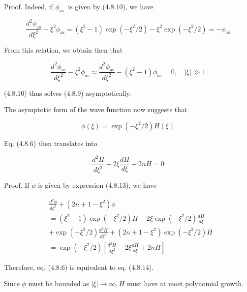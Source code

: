 \documentclass{article}
\begin{document}
Proof. Indeed, if $\phi_{\text {as }}$ is given by (4.8.10), we have
 
\begin{equation*}
\frac{d^{2} \phi_{\mathrm{as}}}{d \xi^{2}}-\xi^{2} \phi_{\mathrm{as}}=\left(\xi^{2}-1\right) \exp \left(-\xi^{2} / 2\right)-\xi^{2} \exp \left(-\xi^{2} / 2\right)=-\phi_{\mathrm{as}} \tag{4.8.11}
\end{equation*}
 

From this relation, we obtain then that
 
\begin{equation*}
\frac{d^{2} \phi_{\mathrm{as}}}{d \xi^{2}}-\xi^{2} \phi_{\mathrm{as}} \approx \frac{d^{2} \phi_{\mathrm{as}}}{d \xi^{2}}-\left(\xi^{2}-1\right) \phi_{\mathrm{as}}=0, \quad|\xi| \gg 1 \tag{4.8.12}
\end{equation*}
 
(4.8.10) thus solves (4.8.9) asymptotically.

The asymptotic form of the wave function now suggests that
 
\begin{equation*}
\phi(\xi)=\exp \left(-\xi^{2} / 2\right) H(\xi) \tag{4.8.13}
\end{equation*}
 

Eq. (4.8.6) then translates into
 
\begin{equation*}
\frac{d^{2} H}{d \xi^{2}}-2 \xi \frac{d H}{d \xi}+2 n H=0 \tag{4.8.14}
\end{equation*}
 

Proof. If $\phi$ is given by expression (4.8.13), we have
 
\begin{align*}
& \frac{d^{2} \phi}{d \xi^{2}}+\left(2 n+1-\xi^{2}\right) \phi  \tag{4.8.15}\\
& =\left(\xi^{2}-1\right) \exp \left(-\xi^{2} / 2\right) H-2 \xi \exp \left(-\xi^{2} / 2\right) \frac{d H}{d \xi} \\
& +\exp \left(-\xi^{2} / 2\right) \frac{d^{2} H}{d \xi^{2}}+\left(2 n+1-\xi^{2}\right) \exp \left(-\xi^{2} / 2\right) H \\
& =\exp \left(-\xi^{2} / 2\right)\left[\frac{d^{2} H}{d \xi^{2}}-2 \xi \frac{d H}{d \xi}+2 n H\right]
\end{align*}
 

Therefore, eq. (4.8.6) is equivalent to eq. (4.8.14).

Since $\phi$ must be bounded as $|\xi| \rightarrow \infty, H$ must have at most polynomial growth.
\end{document}
